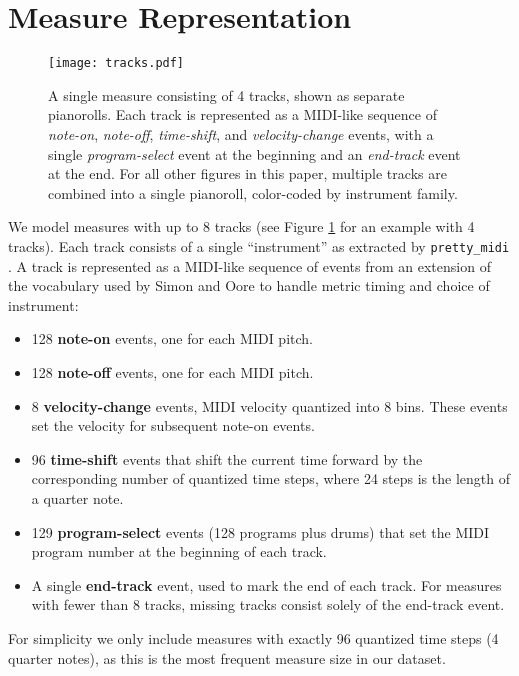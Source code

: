 \documentclass{article}
\begin{document}
\section{Measure Representation}
\label{sec:measure_representation}

\begin{figure}
    \centering
    \texttt{[image: tracks.pdf]}
    \caption{A single measure consisting of 4 tracks, shown as separate pianorolls.  Each track is represented as a MIDI-like sequence of {\it note-on}, {\it note-off}, {\it time-shift}, and {\it velocity-change} events, with a single {\it program-select} event at the beginning and an {\it end-track} event at the end.  For all other figures in this paper, multiple tracks are combined into a single pianoroll, color-coded by instrument family.}
    \label{fig:tracks}
\end{figure}


We model measures with up to 8 tracks (see Figure \ref{fig:tracks} for an example with 4 tracks).  Each track consists of a single ``instrument'' as extracted by \texttt{pretty\_midi} \cite{pretty_midi}.  A track is represented as a MIDI-like sequence of events from an extension of the vocabulary used by Simon and Oore  \cite{performance-rnn-2017} to handle metric timing and choice of instrument:
\begin{itemize}[nolistsep]
\item 128 {\bf note-on} events, one for each MIDI pitch.
\item 128 {\bf note-off} events, one for each MIDI pitch.
\item 8 {\bf velocity-change} events, MIDI velocity quantized into 8 bins.  These events set the velocity for subsequent note-on events.
\item 96 {\bf time-shift} events that shift the current time forward by the corresponding number of quantized time steps, where 24 steps is the length of a quarter note.
\item 129 {\bf program-select} events (128 programs plus drums) that set the MIDI program number at the beginning of each track.
\item A single {\bf end-track} event, used to mark the end of each track.  For measures with fewer than 8 tracks, missing tracks consist solely of the end-track event.
\end{itemize}
For simplicity we only include measures with exactly 96 quantized time steps (4 quarter notes), as this is the most frequent measure size in our dataset.
\end{document}

